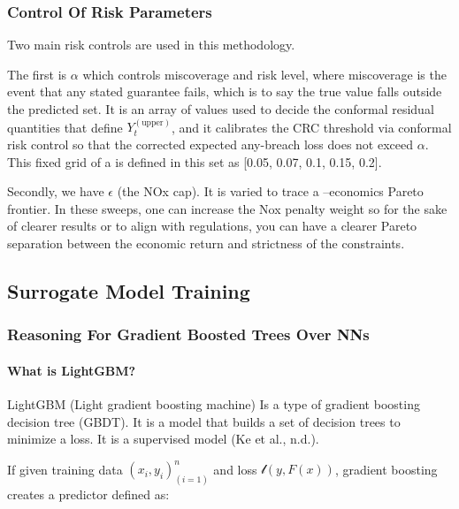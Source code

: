 \documentclass[11pt]{article}
\begin{document}
\subsubsection{Control Of Risk
Parameters}\label{control-of-risk-parameters}

Two main risk controls are used in this methodology.

The first is \(\alpha\) which controls miscoverage and risk level, where
miscoverage is the event that any stated guarantee fails, which is to
say the true value falls outside the predicted set. It is an array of
values used to decide the conformal residual quantities that define
\(Y_{t}^{\left( \text{upper} \right)}\), and it calibrates the CRC
threshold via conformal risk control so that the corrected expected
any-breach loss does not exceed \(\alpha\). This fixed grid of a is
defined in this set as {[}0.05, 0.07, 0.1, 0.15, 0.2{]}.

Secondly, we have \(\epsilon\) (the NOx cap). It is varied to trace a
--economics Pareto frontier. In these sweeps, one can increase the Nox
penalty weight so for the sake of clearer results or to align with
regulations, you can have a clearer Pareto separation between the
economic return and strictness of the constraints.

\subsection{Surrogate Model Training}\label{surrogate-model-training}

\subsubsection{Reasoning For Gradient Boosted Trees Over
NNs}\label{reasoning-for-gradient-boosted-trees-over-nns}

\paragraph{\texorpdfstring{What is LightGBM?
}{What is LightGBM? }}\label{what-is-lightgbm}

LightGBM (Light gradient boosting machine) Is a type of gradient
boosting decision tree (GBDT). It is a model that builds a set of
decision trees to minimize a loss. It is a supervised model (Ke et al.,
n.d.).

If given training data \(\left( x_{i},y_{i} \right)_{(i = 1)}^{n}\) and
loss \(\mathcal{l}\left( y,F(x) \right)\), gradient boosting creates a
predictor defined as:
\end{document}
